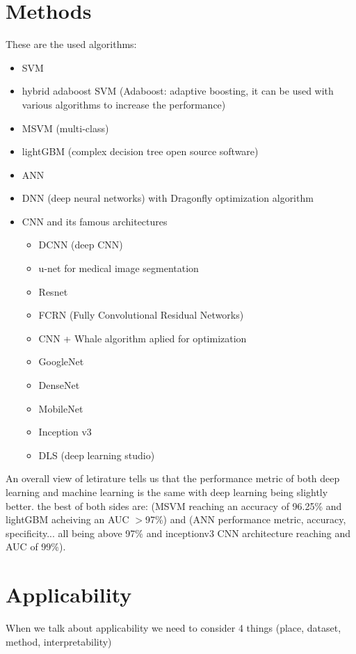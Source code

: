 \section{Methods}
    These are the used algorithms:
    \begin{itemize}
        \item SVM 
        \item hybrid adaboost SVM (Adaboost: adaptive boosting, it can be used with various algorithms to increase the performance)
        \item MSVM (multi-class) 
        \item lightGBM (complex decision tree open source software) 
        \item ANN
        \item DNN (deep neural networks) with Dragonfly optimization algorithm 
        \item CNN and its famous architectures 
        \begin{itemize}
            \item DCNN (deep CNN) 
            \item u-net for medical image segmentation
            \item Resnet 
            \item FCRN (Fully Convolutional Residual Networks) 
            \item CNN + Whale algorithm aplied for optimization
            \item GoogleNet 
            \item DenseNet 
            \item MobileNet 
            \item Inception v3
            \item DLS (deep learning studio) 
        \end{itemize}
    \end{itemize}
    An overall view of letirature tells us that the performance metric of both deep learning and machine learning is the same with deep learning being slightly better. the best of both sides are: (MSVM reaching an accuracy of 96.25\% and lightGBM acheiving an AUC $>$97\%) and (ANN performance metric, accuracy, specificity... all being above 97\% and inceptionv3 CNN architecture reaching and AUC of 99\%).


    
\section{Applicability}
    When we talk about applicability we need to consider 4 things (place, dataset, method, interpretability)
    
